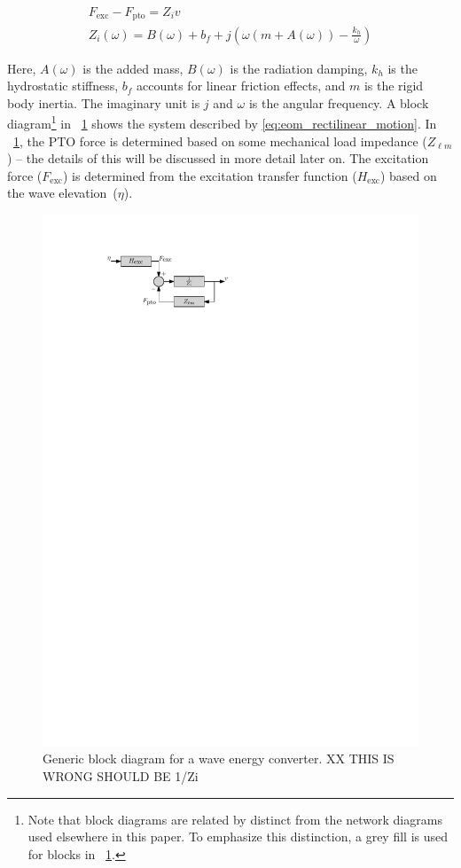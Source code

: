 \documentclass[lettersize,journal]{IEEEtran}
\begin{document}
\begin{subequations}
\begin{gather}
        F_{\textrm{exc}} - F_{\textrm{pto}} = Z_i v \label{eq:eom_rectilinear_motion} \\
        Z_i(\omega) = B(\omega) + b_f + j \left( \omega \left( m + A(\omega) \right) - \frac{k_{h}}{\omega}\right)
\end{gather}
\end{subequations}

\noindent{}\noindent{}Here, $A(\omega)$ is the added mass, $B(\omega)$ is the radiation damping, $k_h$ is the hydrostatic stiffness, $b_f$ accounts for linear friction effects, and $m$ is the rigid body inertia.
The imaginary unit is $j$ and $\omega$ is the angular frequency.
A block diagram\footnote{\label{fn:block_diagrams}Note that block diagrams are related by distinct from the network diagrams used elsewhere in this paper. To emphasize this distinction, a grey fill is used for blocks in \figurename~\ref{fig:wec_as_multiport_block_diagram}.} in \figurename~\ref{fig:wec_as_multiport_block_diagram} shows the system described by \eqref{eq:eom_rectilinear_motion}.
In \figurename~\ref{fig:wec_as_multiport_block_diagram}, the PTO force is determined based on some mechanical load impedance ($Z_{\ell m}$) -- the details of this will be discussed in more detail later on.
The excitation force ($F_{\textrm{exc}}$) is determined from the excitation transfer function ($H_{\textrm{exc}}$) based on the wave elevation~($\eta$).

\begin{figure}[tb]
        \centering
        \includegraphics[width=0.8\columnwidth]{wec_as_multiport_block_diagram.pdf}
        \caption{Generic block diagram for a wave energy converter. XX THIS IS WRONG SHOULD BE 1/Zi}
        \label{fig:wec_as_multiport_block_diagram}
\end{figure}
\end{document}
